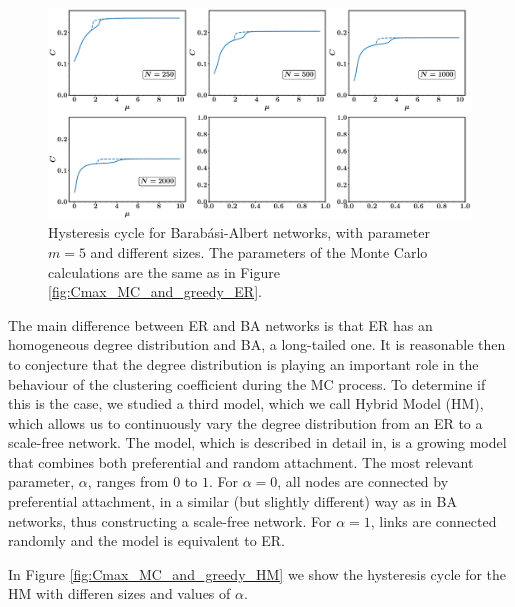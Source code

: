 \documentclass{article}
\begin{document}
\begin{figure}[ht!]
\centering
\includegraphics[scale=0.27]{./figs/Cmax_MC_and_greedy_BA}
\caption{Hysteresis cycle for Barab\'asi-Albert networks, with parameter $m = 5$ and different sizes. The parameters of the Monte Carlo calculations are the same as in Figure \ref{fig:Cmax_MC_and_greedy_ER}.}
\label{fig:Cmax_MC_and_greedy_BA}
\end{figure}

The main difference between ER and BA networks is that ER has an homogeneous degree distribution and BA, a long-tailed one. It is reasonable then to conjecture that the degree distribution is playing an important role in the behaviour of the clustering coefficient during the MC process. To determine if this is the case, we studied a third model, which we call Hybrid Model (HM), which allows us to continuously vary the degree distribution from an ER to a scale-free network. The model, which is described in detail in\cite{Gomez-Gardenes2006FromNetworks}, is a growing model that combines both preferential and random attachment. The most relevant parameter, $\alpha$, ranges from $0$ to $1$. For $\alpha = 0$, all nodes are connected by preferential attachment, in a similar (but slightly different) way as in BA networks, thus constructing a scale-free network. For $\alpha = 1$, links are connected randomly and the model is equivalent to ER. 

In Figure \ref{fig:Cmax_MC_and_greedy_HM} we show the hysteresis cycle for the HM with differen sizes and values of $\alpha$.
\end{document}
